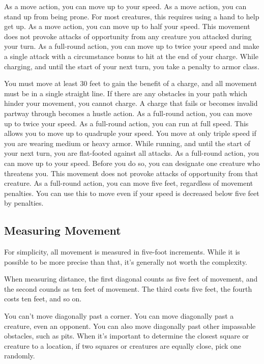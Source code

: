  As a move action, you can move up to your speed.
 As a move action, you can stand up from being prone. For most creatures, this requires using a hand to help get up.
 As a move action, you can move up to half your speed. This movement does not provoke attacks of opportunity from any creature you attacked during your turn.
 As a full-round action, you can move up to twice your speed and make a single attack with a  circumstance bonus to hit at the end of your charge. While charging, and until the start of your next turn, you take a  penalty to armor class.
\par You must move at least 30 feet to gain the benefit of a charge, and all movement must be in a single straight line. If there are any obstacles in your path which hinder your movement, you cannot charge. A charge that fails or becomes invalid partway through becomes a hustle action.
 As a full-round action, you can move up to twice your speed.
 As a full-round action, you can run at full speed. This allows you to move up to quadruple your speed. You move at only triple speed if you are wearing medium or heavy armor. While running, and until the start of your next turn, you are flat-footed against all attacks. 
 As a full-round action, you can move up to your speed. Before you do so, you can designate one creature who threatens you. This movement does not provoke attacks of opportunity from that creature.
 As a full-round action, you can move five feet, regardless of movement penalties. You can use this to move even if your speed is decreased below five feet by penalties. 

\subsection{Measuring Movement}
For simplicity, all movement is measured in five-foot increments. While it is possible to be more precise than that, it's generally not worth the complexity.

 When measuring distance, the first diagonal counts
as five feet of movement, and the second counds as ten feet of movement. The third costs five feet, the fourth costs ten feet, and so on.

You can't move diagonally past a corner. You can move diagonally past a creature, even an opponent. You can also move diagonally past other impassable obstacles, such as pits.
 When it's important to determine the closest square or creature to a location, if two squares or creatures are equally close, pick one randomly.

